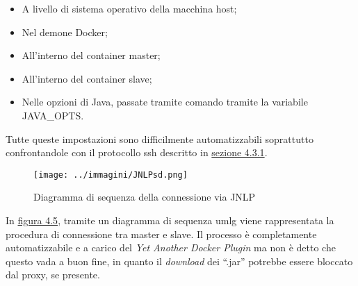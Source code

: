 \begin{itemize}
    \item A livello di sistema operativo della macchina \gls{host};
    \item Nel \gls{demone} Docker;
    \item All'interno del \gls{container} master;
    \item All'interno del container slave;
    \item Nelle opzioni di Java, passate tramite comando tramite la variabile JAVA\_OPTS.
\end{itemize}

Tutte queste impostazioni sono difficilmente automatizzabili soprattutto confrontandole con il protocollo \gls{ssh} descritto in \hyperref[subsec:ssh]{sezione 4.3.1}.

\begin{figure}[H]
    \capstart
    \label{fig:jnlp-connection}
    \captionsetup{justification=centering}
    \centering
    \texttt{[image: ../immagini/JNLPsd.png]}
    \caption{Diagramma di sequenza della connessione via JNLP}
\end{figure}

In \hyperref[fig:jnlp-connection]{figura 4.5}, tramite un diagramma di sequenza \gls{umlg} viene rappresentata la procedura di connessione tra master e slave. Il processo è completamente automatizzabile e a carico del \textit{Yet Another Docker Plugin} ma non è detto che questo vada a buon fine, in quanto il \textit{download} dei ``.\gls{jar}'' potrebbe essere bloccato dal proxy, se presente.  